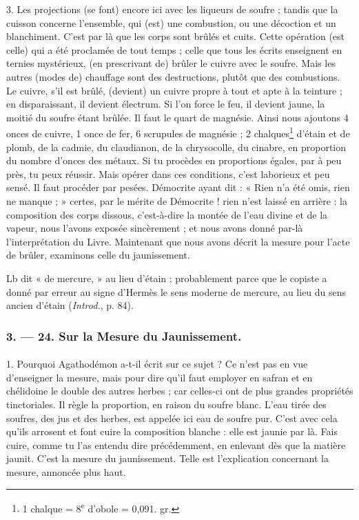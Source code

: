 \documentclass[a4paper, 11pt, oneside, polutonikogreek, french]{article}
\begin{document}
3. Les projections (se font) encore ici avec les liqueurs de soufre ; tandis que la cuisson concerne l'ensemble, qui (est) une combustion, ou une décoction et un blanchiment. C'est par là que les corps sont brûlés et cuits. Cette opération (est celle) qui a été proclamée de tout temps ; celle que tous les écrits enseignent en ternies mystérieux, (en prescrivant de) brûler le cuivre avec le soufre. Mais les autres (modes de) chauffage sont des destructions, plutôt que des combustions. Le cuivre, s'il est brûlé, (devient) un cuivre propre à tout et apte à la teinture ; en disparaissant, il devient électrum. Si l'on force le feu, il devient jaune, la moitié du soufre étant brûlée. Il faut le quart de magnésie. Ainsi nous ajoutons 4 onces de cuivre, 1 once de fer, 6 scrupules de magnésie ; 2 chalques\footnote{1 chalque = 8\textsuperscript{e} d'obole = 0,091. gr.  } d'étain et de plomb, de la cadmie, du claudianon, de la chrysocolle, du cinabre, en proportion du nombre d'onces des métaux. Si tu procèdes en proportions égales, par à peu près, tu peux réussir. Mais opérer dans ces conditions, c'est laborieux et peu sensé. Il faut procéder par pesées. Démocrite ayant dit : « Rien n'a été omis, rien ne manque ; » certes, par le mérite de Démocrite ! rien n'est laissé en arrière : la composition des corps dissous, c'est-à-dire la montée de l'eau divine et de la vapeur, nous l'avons exposée sincèrement ; et nous avons donné par-là l'interprétation du Livre. Maintenant que nous avons décrit la mesure pour l'acte de brûler, examinons celle du jaunissement.

Lb dit « de mercure, » au lieu d'étain ; probablement parce que le copiste a donné par erreur au signe d'Hermès le sens moderne de mercure, au lieu du sens ancien d'étain (\emph{Introd.}, p. 84).

\bigskip
\centerline{\EightStarTaper}
\centerline{\EightStarTaper\EightStarTaper}
\bigskip

\subsubsection{3. --- 24. Sur la Mesure du Jaunissement.}
\paragraph{}
1. Pourquoi Agathodémon a-t-il écrit sur ce sujet ? Ce n'est pas en vue d'enseigner la mesure, mais pour dire qu'il faut employer en safran et en chélidoine le double des autres herbes ; car celles-ci ont de plus grandes propriétés tinctoriales. Il règle la proportion, en raison du soufre blanc. L'eau tirée des soufres, des jus et des herbes, est appelée ici eau de soufre pur. C'est avec cela qu'ils arrosent et font cuire la composition blanche : elle est jaunie par là. Fais cuire, comme tu l'as entendu dire précédemment, en enlevant dès que la matière jaunit. C'est la mesure du jaunissement. Telle est l'explication concernant la mesure, annoncée plus haut.
\end{document}
